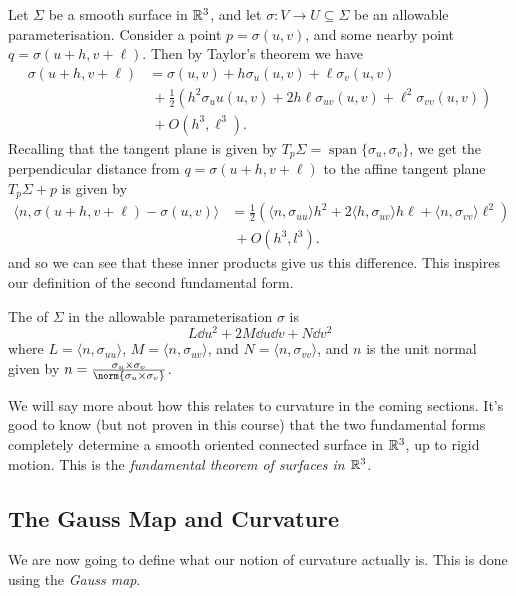 \documentclass[a4paper, 10pt, twocolumn]{amsart}
\begin{document}
Let $\Sigma$ be a smooth surface in $\mathbb{R}^3$, and let $\sigma: V \rightarrow U \subseteq \Sigma$ be an allowable parameterisation. Consider a point $p = \sigma(u, v)$, and some nearby point $q = \sigma(u + h, v + \ell)$. Then by Taylor's theorem we have
\begin{align*}
\sigma(u + h, v + \ell) &= \sigma(u, v) + h \sigma_u(u, v) + \ell \sigma_v(u, v) \\
&\ + \frac{1}{2}\left(h^2 \sigma_uu(u, v) + 2 h\ell \sigma_{uv}(u, v) + \ell^2 \sigma_{vv}(u, v)\right)\\&\ + O(h^3, \ell^3).
\end{align*}
Recalling that the tangent plane is given by $T_p\Sigma = \operatorname{span}\{\sigma_u, \sigma_v\}$, we get the perpendicular distance from $q = \sigma(u + h, v+\ell)$ to the affine tangent plane $T_p\Sigma + p$ is given by
\begin{align*}
    \langle n, \sigma(u + h, v + \ell) - \sigma(u, v)\rangle &= \frac{1}{2}\left(\langle n, \sigma_{uu} \rangle h^2 + 2 \langle h, \sigma_{uv}\rangle h \ell + \langle n, \sigma_{vv} \rangle \ell^2\right)\\&\  + O(h^3, l^3). 
\end{align*}
and so we can see that these inner products give us this difference. This inspires our definition of the second fundamental form.

\begin{definition}
    The  of $\Sigma$ in the allowable parameterisation $\sigma$ is
    $$
    L \dd u^2 + 2M \dd u \dd v + N \dd v^2
    $$
    where $L = \langle n, \sigma_{uu} \rangle$, $M =  \langle n, \sigma_{uv} \rangle$, and $N = \langle n, \sigma_{vv} \rangle$, and $n$ is the unit normal given by $n = \frac{\sigma_u \times \sigma_v}{\norm{\sigma_u \times \sigma_v}}$.
\end{definition}

We will say more about how this relates to curvature in the coming sections. It's good to know (but not proven in this course) that the two fundamental forms completely determine a smooth oriented connected surface in $\mathbb{R}^3$, up to rigid motion. This is the \emph{fundamental theorem of surfaces in $\mathbb{R}^3$}.

\subsection{The Gauss Map and Curvature}

We are now going to define what our notion of curvature actually is. This is done using the \emph{Gauss map}.
\end{document}
